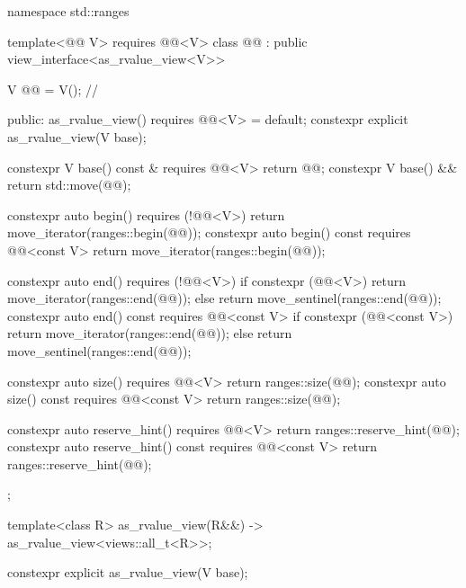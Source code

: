 \begin{codeblock}
namespace std::ranges {
  template<@@ V>
    requires @@<V>
  class @@ : public view_interface<as_rvalue_view<V>> {
    V @@ = V();      // \expos

  public:
    as_rvalue_view() requires @@<V> = default;
    constexpr explicit as_rvalue_view(V base);

    constexpr V base() const & requires @@<V> { return @@; }
    constexpr V base() && { return std::move(@@); }

    constexpr auto begin() requires (!@@<V>)
    { return move_iterator(ranges::begin(@@)); }
    constexpr auto begin() const requires @@<const V>
    { return move_iterator(ranges::begin(@@)); }

    constexpr auto end() requires (!@@<V>) {
      if constexpr (@@<V>) {
        return move_iterator(ranges::end(@@));
      } else {
        return move_sentinel(ranges::end(@@));
      }
    }
    constexpr auto end() const requires @@<const V> {
      if constexpr (@@<const V>) {
        return move_iterator(ranges::end(@@));
      } else {
        return move_sentinel(ranges::end(@@));
      }
    }

    constexpr auto size() requires @@<V> { return ranges::size(@@); }
    constexpr auto size() const requires @@<const V> { return ranges::size(@@); }

    constexpr auto reserve_hint() requires @@<V>
    { return ranges::reserve_hint(@@); }
    constexpr auto reserve_hint() const requires @@<const V>
    { return ranges::reserve_hint(@@); }
  };

  template<class R>
    as_rvalue_view(R&&) -> as_rvalue_view<views::all_t<R>>;
}
\end{codeblock}

%
\begin{itemdecl}
constexpr explicit as_rvalue_view(V base);
\end{itemdecl}

